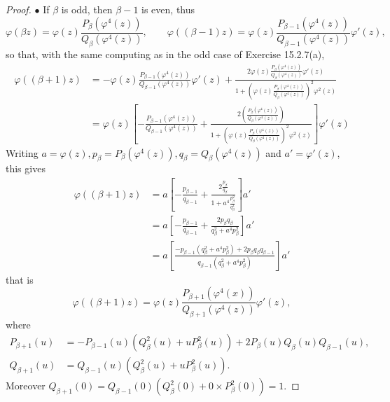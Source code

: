 \documentclass[11pt,a4paper]{article}
\begin{document}
\begin{proof}
 $\bullet$ If $\beta$ is odd, then $\beta - 1$ is even, thus
 $$\varphi(\beta z) = \varphi(z) \frac{P_\beta\left(\varphi^4(z)\right)}{Q_\beta\left(\varphi^4(z)\right)},\qquad 
 \varphi((\beta - 1) z) = \varphi(z) \frac{P_{\beta - 1}\left(\varphi^4(z)\right)}{Q_{\beta - 1}\left(\varphi^4(z)\right)}\varphi'(z) ,
 $$
 so that, with the same computing as in the odd case of Exercise 15.2.7(a),
 \begin{align*}
 \varphi((\beta + 1) z) &=-\varphi(z) \frac{P_{\beta - 1}\left(\varphi^4(z)\right)}{Q_{\beta - 1}\left(\varphi^4(z)\right)}\varphi'(z) +\frac{2 \varphi(z) \frac{P_{\beta}\left(\varphi^4(z)\right)}{Q_{\beta}\left(\varphi^4(z)\right)}\varphi'(z)}{1 +  \left(\varphi(z) \frac{P_{\beta}\left(\varphi^4(z)\right)}{Q_{\beta}\left(\varphi^4(z)\right)}\right)^2 \varphi^2(z)}\\
&=\varphi(z) \left[ -  \frac{P_{\beta - 1}\left(\varphi^4(z)\right)}{Q_{\beta - 1}\left(\varphi^4(z)\right)} + \frac{2 \left(\frac{P_{\beta}\left(\varphi^4(z)\right)}{Q_{\beta}\left(\varphi^4(z)\right)}  \right) }{1+\left(\varphi(z)\frac{P_{\beta}\left(\varphi^4(z)\right)}{Q_{\beta}\left(\varphi^4(z)\right)}  \right)^2 \varphi^2(z)}\right] \varphi'(z)
\end{align*}
Writing $a= \varphi(z), p_\beta = P_{\beta}(\varphi^4(z)), q_\beta  = Q_{\beta}(\varphi^4(z))$ and  $a' = \varphi'(z)$, this gives
\begin{align*}
\varphi\left((\beta + 1)z\right)&= a \left[ -\frac{p_{\beta-1}}{q_{\beta-1}} + \frac{2 \frac{p_\beta}{q_\beta}}{1 + a^4 \frac{p_\beta^2}{q_\beta^2}}\right] a'\\
&= a \left[ -\frac{p_{\beta-1}}{q_{\beta-1}}  +\frac{ 2 p_\beta q_\beta}{q_\beta^2 + a^4 p_\beta^2}\right] a' \\
&=a\left[ \frac{-p_{\beta-1} (q_\beta^2 + a^4 p_\beta^2) + 2 p_\beta q_\beta q_{\beta-1}} {q_{\beta-1}(q_\beta^2 + a^4 p_\beta^2)}\right] a'
\end{align*}
that is
$$\varphi\left((\beta + 1) z\right) = \varphi(z) \frac{P_{\beta + 1}(\varphi^4(x))}{Q_{\beta + 1}(\varphi^4(z))}\varphi'(z),$$
where
\begin{align*}
P_{\beta + 1}(u) &= -P_{\beta - 1}(u) (Q_{\beta}^2(u) + u P_{\beta}^2(u)) + 2 P_{\beta}(u)Q_{\beta}(u) Q_{\beta - 1}(u),\\
Q_{\beta + 1}(u) &=Q_{\beta - 1}(u)(Q_{\beta}^2(u) + u P_{\beta}^2(u)).
\end{align*}
Moreover $Q_{\beta + 1}(0) = Q_{\beta - 1}(0)(Q_{\beta}^2(0) + 0 \times P_{\beta}^2(0)) = 1$.


\end{proof}
\end{document}
